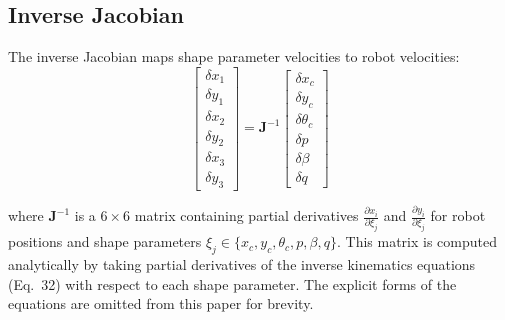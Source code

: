 \documentclass[lettersize,journal]{IEEEtran}
\begin{document}
\subsection{Inverse Jacobian}

The inverse Jacobian maps shape parameter velocities to robot velocities:
\begin{equation}
\begin{bmatrix}
\delta x_1 \\ \delta y_1 \\ \delta x_2 \\ \delta y_2 \\ \delta x_3 \\ \delta y_3
\end{bmatrix} =
\mathbf{J}^{-1}
\begin{bmatrix}
\delta x_c \\ \delta y_c \\ \delta \theta_c \\ \delta p \\ \delta \beta \\ \delta q
\end{bmatrix}
\end{equation}

where $\mathbf{J}^{-1}$ is a $6 \times 6$ matrix containing partial derivatives $\frac{\partial x_i}{\partial \xi_j}$ and $\frac{\partial y_i}{\partial \xi_j}$ for robot positions and shape parameters $\xi_j \in \{x_c, y_c, \theta_c, p, \beta, q\}$. This matrix is computed analytically by taking partial derivatives of the inverse kinematics equations (Eq.~32) with respect to each shape parameter. The explicit forms of the equations are omitted from this paper for brevity.
\end{document}
